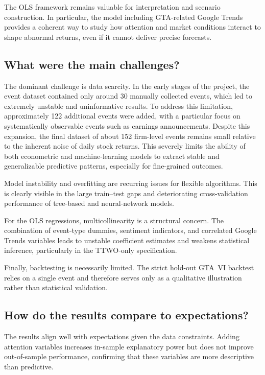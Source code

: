 \documentclass[11pt,a4paper]{article}
\begin{document}
The OLS framework remains valuable for interpretation and scenario construction. In particular, the model including GTA-related Google Trends provides a coherent way to study how attention and market conditions interact to shape abnormal returns, even if it cannot deliver precise forecasts.

\subsection{What were the main challenges?}

The dominant challenge is data scarcity. In the early stages of the project, the event dataset contained only around 30 manually collected events, which led to extremely unstable and uninformative results. To address this limitation, approximately 122 additional events were added, with a particular focus on systematically observable events such as earnings announcements. Despite this expansion, the final dataset of about 152 firm-level events remains small relative to the inherent noise of daily stock returns. This severely limits the ability of both econometric and machine-learning models to extract stable and generalizable predictive patterns, especially for fine-grained outcomes.

Model instability and overfitting are recurring issues for flexible algorithms. This is clearly visible in the large train--test gaps and deteriorating cross-validation performance of tree-based and neural-network models.

For the OLS regressions, multicollinearity is a structural concern. The combination of event-type dummies, sentiment indicators, and correlated Google Trends variables leads to unstable coefficient estimates and weakens statistical inference, particularly in the TTWO-only specification.

Finally, backtesting is necessarily limited. The strict hold-out GTA~VI backtest relies on a single event and therefore serves only as a qualitative illustration rather than statistical validation.

\subsection{How do the results compare to expectations?}

The results align well with expectations given the data constraints. Adding attention variables increases in-sample explanatory power but does not improve out-of-sample performance, confirming that these variables are more descriptive than predictive.
\end{document}
